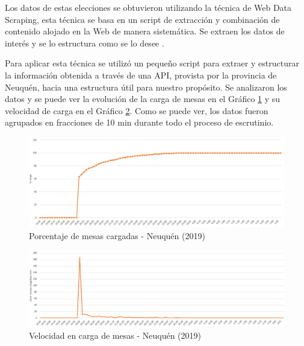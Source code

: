 Los datos de estas elecciones se obtuvieron utilizando la técnica de Web Data Scraping, esta técnica se basa en un script de extracción y combinación de contenido alojado en la Web de manera sistemática. Se extraen los datos de interés y se lo estructura como se lo desee \cite{glez2014web}.

Para aplicar esta técnica se utilizó un pequeño script para extraer y estructurar la información obtenida a través de una API, provista por la provincia de Neuquén, hacia una estructura útil para nuestro propósito. Se analizaron los datos y se puede ver la evolución de la carga de mesas en el Gráfico \ref{graf:porcentajeNeuquen} y su velocidad de carga en el Gráfico \ref{graf:velocidadNeuquen}. Como se puede ver, los datos fueron agrupados en fracciones de 10 min durante todo el proceso de escrutinio.

\begin{figure}[h!]
  \includegraphics[width=1\textwidth]{img/fOI0sHj9ac.png}
  \caption{Porcentaje de mesas cargadas - Neuquén (2019)}
  \label{graf:porcentajeNeuquen}
\end{figure}

\begin{figure}[h!]
  \includegraphics[width=1\textwidth]{img/QOsSnICbyL.png}
  \caption{Velocidad en carga de mesas - Neuquén (2019)}
  \label{graf:velocidadNeuquen}
\end{figure}


